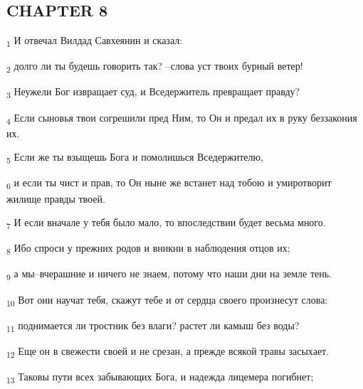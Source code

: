 \subsection{CHAPTER 8}
\begin{tcolorbox}
\textsubscript{1} И отвечал Вилдад Савхеянин и сказал:
\end{tcolorbox}
\begin{tcolorbox}
\textsubscript{2} долго ли ты будешь говорить так? --слова уст твоих бурный ветер!
\end{tcolorbox}
\begin{tcolorbox}
\textsubscript{3} Неужели Бог извращает суд, и Вседержитель превращает правду?
\end{tcolorbox}
\begin{tcolorbox}
\textsubscript{4} Если сыновья твои согрешили пред Ним, то Он и предал их в руку беззакония их.
\end{tcolorbox}
\begin{tcolorbox}
\textsubscript{5} Если же ты взыщешь Бога и помолишься Вседержителю,
\end{tcolorbox}
\begin{tcolorbox}
\textsubscript{6} и если ты чист и прав, то Он ныне же встанет над тобою и умиротворит жилище правды твоей.
\end{tcolorbox}
\begin{tcolorbox}
\textsubscript{7} И если вначале у тебя было мало, то впоследствии будет весьма много.
\end{tcolorbox}
\begin{tcolorbox}
\textsubscript{8} Ибо спроси у прежних родов и вникни в наблюдения отцов их;
\end{tcolorbox}
\begin{tcolorbox}
\textsubscript{9} а мы--вчерашние и ничего не знаем, потому что наши дни на земле тень.
\end{tcolorbox}
\begin{tcolorbox}
\textsubscript{10} Вот они научат тебя, скажут тебе и от сердца своего произнесут слова:
\end{tcolorbox}
\begin{tcolorbox}
\textsubscript{11} поднимается ли тростник без влаги? растет ли камыш без воды?
\end{tcolorbox}
\begin{tcolorbox}
\textsubscript{12} Еще он в свежести своей и не срезан, а прежде всякой травы засыхает.
\end{tcolorbox}
\begin{tcolorbox}
\textsubscript{13} Таковы пути всех забывающих Бога, и надежда лицемера погибнет;
\end{tcolorbox}
